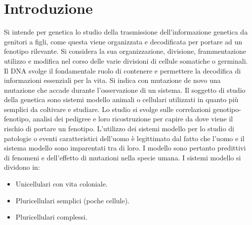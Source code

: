 \chapter{Introduzione}
Si intende per genetica lo studio della trasmissione dell'informazione genetica da genitori a figli, come questa viene organizzata e decodificata per portare ad un fenotipo rilevante. 
Si considera la sua organizzazione, divisione, frammentazione utilizzo e modifica nel corso delle varie divisioni di cellule somatiche o germinali. Il DNA svolge il fondamentale
ruolo di contenere e permettere la decodifica di informazioni essenziali per la vita. Si indica con mutazione de novo una mutazione che accade durante l'osservazione di un sistema.
Il soggetto di studio della genetica sono sistemi modello animali o cellulari utilizzati in quanto pi\`u semplici da coltivare e studiare. Lo studio si svolge sulle correlazioni 
genotipo-fenotipo, analisi dei pedigree e loro ricostruzione per capire da dove viene il rischio di portare un fenotipo. L'utilizzo dei sistemi modello per lo studio di patologie o 
eventi caratteristici dell'uomo \`e legittimato dal fatto che l'uomo e il sistema modello sono imparentati tra di loro. I modello sono pertanto predittivi di fenomeni e dell'effetto di 
mutazioni nella specie umana. I sistemi modello si dividono in:
\begin{multicols}{2}
\begin{itemize}
	\item Unicellulari con vita coloniale.
	\item Pluricellulari semplici (poche cellule).
	\item Pluricellulari complessi. 
\end{itemize}
\end{multicols}
